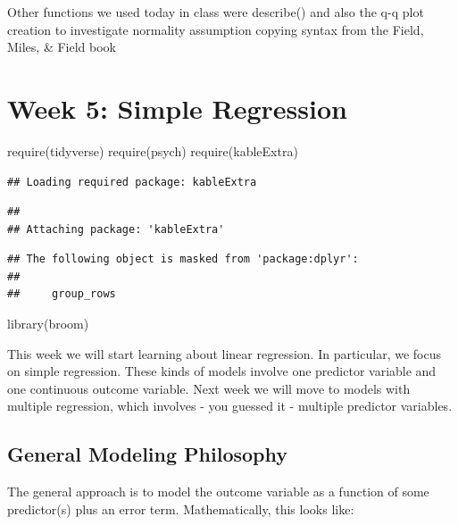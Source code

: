 \documentclass[
]{book}
\newenvironment{Shaded}{\begin{snugshade}}{\end{snugshade}}
\newcommand{\FunctionTok}[1]{\textcolor[rgb]{0.00,0.00,0.00}{#1}}
\newcommand{\NormalTok}[1]{#1}
\begin{document}
Other functions we used today in class were describe() and also the q-q plot creation to investigate normality assumption copying syntax from the Field, Miles, \& Field book

\hypertarget{week-5-simple-regression}{%
\chapter{Week 5: Simple Regression}\label{week-5-simple-regression}}

\begin{Shaded}
\begin{Highlighting}[]
\FunctionTok{require}\NormalTok{(tidyverse)}
\FunctionTok{require}\NormalTok{(psych)}
\FunctionTok{require}\NormalTok{(kableExtra)}
\end{Highlighting}
\end{Shaded}

\begin{verbatim}
## Loading required package: kableExtra
\end{verbatim}

\begin{verbatim}
## 
## Attaching package: 'kableExtra'
\end{verbatim}

\begin{verbatim}
## The following object is masked from 'package:dplyr':
## 
##     group_rows
\end{verbatim}

\begin{Shaded}
\begin{Highlighting}[]
\FunctionTok{library}\NormalTok{(broom)}
\end{Highlighting}
\end{Shaded}

This week we will start learning about linear regression. In particular, we focus on simple regression. These kinds of models involve one predictor variable and one continuous outcome variable. Next week we will move to models with multiple regression, which involves - you guessed it - multiple predictor variables.

\hypertarget{general-modeling-philosophy}{%
\section{General Modeling Philosophy}\label{general-modeling-philosophy}}

The general approach is to model the outcome variable as a function of some predictor(s) plus an error term. Mathematically, this looks like:
\end{document}
